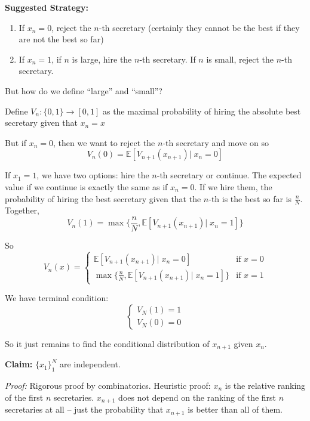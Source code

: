 \documentclass[12pt]{report}
\newcommand{\E}{\mathbb{E}}
\begin{document}
        \textbf{Suggested Strategy:}
        \begin{enumerate}
            \item If $x_n = 0$, reject the $n$-th secretary (certainly they cannot be the best if they are not the best so far)
            \item If $x_n = 1$, if $n$ is large, hire the $n$-th secretary. If $n$ is small, reject the $n$-th secretary.
        \end{enumerate}

        But how do we define ``large'' and ``small''?

        Define $V_n: \{0, 1\} \to [0, 1]$ as the maximal probability of hiring the absolute best secretary given that $x_n = x$

        But if $x_n = 0$, then we want to reject the $n$-th secretary and move on so 
        \[V_n(0) = \E[V_{n+1}(x_{n+1}) \big\vert\;  x_n = 0]\]

        If $x_1 = 1$, we have two options: hire the $n$-th secretary or continue. The expected value if we continue is exactly the same as if $x_n = 0$. If we hire them, the probability of hiring the best secretary given that the $n$-th is the best so far is $\frac{n}{N}$. Together,
        \[V_n(1) = \max\{\frac{n}{N}, \E[V_{n+1}(x_{n+1}) \big\vert \; x_n = 1]\}\]

        So 
        \[V_n(x) = \begin{cases}
            \E[V_{n+1}(x_{n+1}) \big\vert \; x_n = 0] & \text{if } x = 0\\
            \max\{\frac{n}{N}, \E[V_{n+1}(x_{n+1}) \big\vert \; x_n = 1]\} & \text{if } x = 1
        \end{cases}\]

        We have terminal condition:
        \[\begin{cases}
            V_N(1) = 1\\ 
            V_N(0) = 0
        \end{cases}\]

        So it just remains to find the conditional distribution of $x_{n+1}$ given $x_n$. 

        \textbf{Claim:} $\{x_1\}_1^N$ are independent. 

        \emph{Proof:} Rigorous proof by combinatorics. Heuristic proof: $x_n$ is the relative ranking of the first $n$ secretaries. $x_{n+1}$ does not depend on the ranking of the first $n$ secretaries at all -- just the probability that $x_{n+1}$ is better than all of them. 
\end{document}

